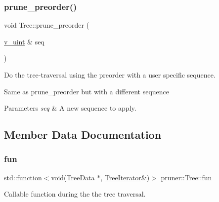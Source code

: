 \subsubsection{\texorpdfstring{prune\+\_\+preorder()}{prune\_preorder()}\hspace{0.1cm}{\footnotesize\ttfamily [2/2]}}
{\footnotesize\ttfamily void Tree\+::prune\+\_\+preorder (\begin{DoxyParamCaption}\item[{\hyperlink{namespacepruner_af0145646bd7ede012cd336b416bc5579}{v\+\_\+uint} \&}]{seq }\end{DoxyParamCaption})\hspace{0.3cm}{\ttfamily [inline]}}



Do the tree-\/traversal using the preorder with a user specific sequence. 

Same as {\ttfamily prune\+\_\+preorder} but with a different sequence 
\begin{DoxyParams}{Parameters}
{\em seq} & A new sequence to apply. \\
\hline
\end{DoxyParams}


\subsection{Member Data Documentation}
\mbox{\label{classpruner_1_1Tree_a243f4077cc9974d6de6a6af0f3e9b0fd}} 
\subsubsection{\texorpdfstring{fun}{fun}}
{\footnotesize\ttfamily std\+::function$<$void(Tree\+Data $\ast$, \hyperlink{classpruner_1_1TreeIterator}{Tree\+Iterator}\&)$>$ pruner\+::\+Tree\+::fun}



Callable function during the the tree traversal. 

